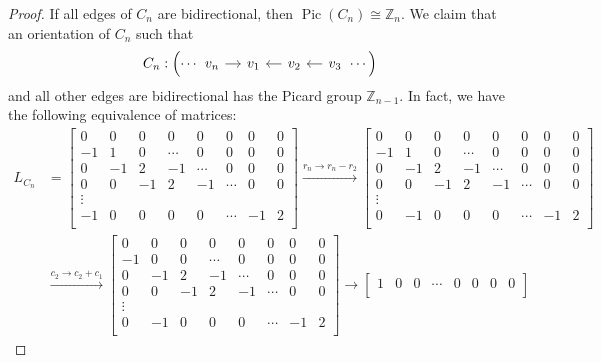\documentclass[11pt,reqno]{amsart}
\DeclareMathOperator{\Pic}{Pic}
\newcommand{\Z}{\mathbb{Z}}
\theoremstyle{definition}
\theoremstyle{plain}
\begin{document}
		\begin{proof}
If all edges of $C_n$ are bidirectional, then $\Pic (C_n) \cong \Z_n$. We claim that an orientation of $C_n$ such that 
			\[
			C_n: \left( \cdots \begin{tikzcd}[column sep=0.4cm]
				v_n \arrow[r] & v_1 & v_2 \arrow[l] & v_3 \arrow[l]
			\end{tikzcd} \cdots \right)
			\]
and all other edges are bidirectional has the Picard group $\mathbb{Z}_{n-1}$. In fact, we have the following equivalence of matrices:
			\begin{align*}
			L_{C_n} &= \begin{bmatrix}
				0 & 0 & 0 & 0 & 0 & 0 & 0 & 0   \\
				-1 & 1 & 0 & \cdots & 0 & 0 & 0 & 0  \\
				0 & -1 & 2 & -1 & \cdots & 0 & 0 & 0 \\
				0 & 0 & -1 & 2 & -1 & \cdots & 0 & 0  \\
				\vdots \\
				-1 & 0 & 0 & 0 & 0 & \cdots & -1 & 2 \\
			\end{bmatrix}
			\stackrel{r_{n} \to r_{n} - r_{2}}\longrightarrow
			\begin{bmatrix}
				0 & 0 & 0 & 0 & 0 & 0 & 0 & 0   \\
				-1 & 1 & 0 & \cdots & 0 & 0 & 0 & 0  \\
				0 & -1 & 2 & -1 & \cdots & 0 & 0 & 0 \\
				0 & 0 & -1 & 2 & -1 & \cdots & 0 & 0  \\
				\vdots \\
				0 & -1 & 0 & 0 & 0 & \cdots & -1 & 2 \\
			\end{bmatrix}\\
			&\stackrel{c_2 \to c_2+c_1}\longrightarrow
			\begin{bmatrix}
				0 & 0 & 0 & 0 & 0 & 0 & 0 & 0   \\
				-1 & 0 & 0 & \cdots & 0 & 0 & 0 & 0 \\
				0 & -1 & 2 & -1 & \cdots & 0 & 0 & 0 \\
				0 & 0 & -1 & 2 & -1 & \cdots & 0 & 0  \\
				\vdots \\
				0 & -1 & 0 & 0 & 0 & \cdots & -1 & 2 \\
			\end{bmatrix}
			\to
			\begin{bmatrix}
				1 & 0 & 0 & \cdots & 0 & 0 & 0 & 0 \\

\end{bmatrix}
\end{align*}
\end{proof}
\end{document}
